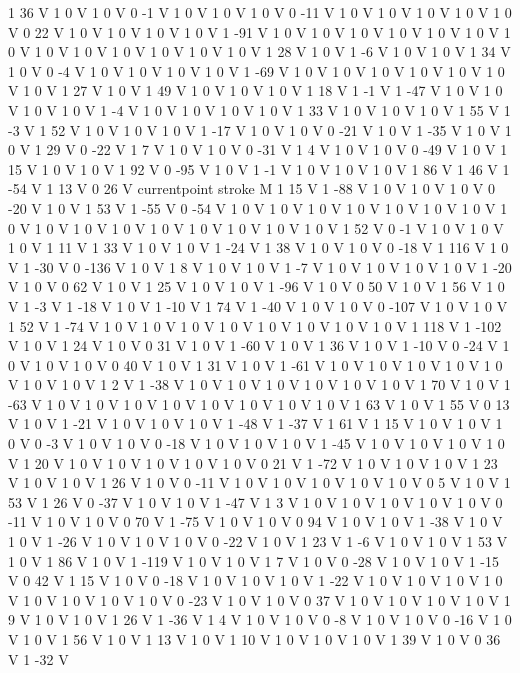 {{1 36 V
1 0 V
1 0 V
0 -1 V
1 0 V
1 0 V
1 0 V
0 -11 V
1 0 V
1 0 V
1 0 V
1 0 V
1 0 V
0 22 V
1 0 V
1 0 V
1 0 V
1 0 V
1 -91 V
1 0 V
1 0 V
1 0 V
1 0 V
1 0 V
1 0 V
1 0 V
1 0 V
1 0 V
1 0 V
1 0 V
1 0 V
1 0 V
1 28 V
1 0 V
1 -6 V
1 0 V
1 0 V
1 34 V
1 0 V
0 -4 V
1 0 V
1 0 V
1 0 V
1 0 V
1 -69 V
1 0 V
1 0 V
1 0 V
1 0 V
1 0 V
1 0 V
1 0 V
1 27 V
1 0 V
1 49 V
1 0 V
1 0 V
1 0 V
1 18 V
1 -1 V
1 -47 V
1 0 V
1 0 V
1 0 V
1 0 V
1 -4 V
1 0 V
1 0 V
1 0 V
1 0 V
1 33 V
1 0 V
1 0 V
1 0 V
1 55 V
1 -3 V
1 52 V
1 0 V
1 0 V
1 0 V
1 -17 V
1 0 V
1 0 V
0 -21 V
1 0 V
1 -35 V
1 0 V
1 0 V
1 29 V
0 -22 V
1 7 V
1 0 V
1 0 V
0 -31 V
1 4 V
1 0 V
1 0 V
0 -49 V
1 0 V
1 15 V
1 0 V
1 0 V
1 92 V
0 -95 V
1 0 V
1 -1 V
1 0 V
1 0 V
1 0 V
1 86 V
1 46 V
1 -54 V
1 13 V
0 26 V
currentpoint stroke M
1 15 V
1 -88 V
1 0 V
1 0 V
1 0 V
0 -20 V
1 0 V
1 53 V
1 -55 V
0 -54 V
1 0 V
1 0 V
1 0 V
1 0 V
1 0 V
1 0 V
1 0 V
1 0 V
1 0 V
1 0 V
1 0 V
1 0 V
1 0 V
1 0 V
1 0 V
1 0 V
1 52 V
0 -1 V
1 0 V
1 0 V
1 0 V
1 11 V
1 33 V
1 0 V
1 0 V
1 -24 V
1 38 V
1 0 V
1 0 V
0 -18 V
1 116 V
1 0 V
1 -30 V
0 -136 V
1 0 V
1 8 V
1 0 V
1 0 V
1 -7 V
1 0 V
1 0 V
1 0 V
1 0 V
1 -20 V
1 0 V
0 62 V
1 0 V
1 25 V
1 0 V
1 0 V
1 -96 V
1 0 V
0 50 V
1 0 V
1 56 V
1 0 V
1 -3 V
1 -18 V
1 0 V
1 -10 V
1 74 V
1 -40 V
1 0 V
1 0 V
0 -107 V
1 0 V
1 0 V
1 52 V
1 -74 V
1 0 V
1 0 V
1 0 V
1 0 V
1 0 V
1 0 V
1 0 V
1 0 V
1 118 V
1 -102 V
1 0 V
1 24 V
1 0 V
0 31 V
1 0 V
1 -60 V
1 0 V
1 36 V
1 0 V
1 -10 V
0 -24 V
1 0 V
1 0 V
1 0 V
0 40 V
1 0 V
1 31 V
1 0 V
1 -61 V
1 0 V
1 0 V
1 0 V
1 0 V
1 0 V
1 0 V
1 0 V
1 2 V
1 -38 V
1 0 V
1 0 V
1 0 V
1 0 V
1 0 V
1 0 V
1 70 V
1 0 V
1 -63 V
1 0 V
1 0 V
1 0 V
1 0 V
1 0 V
1 0 V
1 0 V
1 0 V
1 63 V
1 0 V
1 55 V
0 13 V
1 0 V
1 -21 V
1 0 V
1 0 V
1 0 V
1 -48 V
1 -37 V
1 61 V
1 15 V
1 0 V
1 0 V
1 0 V
0 -3 V
1 0 V
1 0 V
0 -18 V
1 0 V
1 0 V
1 0 V
1 -45 V
1 0 V
1 0 V
1 0 V
1 0 V
1 20 V
1 0 V
1 0 V
1 0 V
1 0 V
1 0 V
0 21 V
1 -72 V
1 0 V
1 0 V
1 0 V
1 23 V
1 0 V
1 0 V
1 26 V
1 0 V
0 -11 V
1 0 V
1 0 V
1 0 V
1 0 V
1 0 V
0 5 V
1 0 V
1 53 V
1 26 V
0 -37 V
1 0 V
1 0 V
1 -47 V
1 3 V
1 0 V
1 0 V
1 0 V
1 0 V
1 0 V
0 -11 V
1 0 V
1 0 V
0 70 V
1 -75 V
1 0 V
1 0 V
0 94 V
1 0 V
1 0 V
1 -38 V
1 0 V
1 0 V
1 -26 V
1 0 V
1 0 V
1 0 V
0 -22 V
1 0 V
1 23 V
1 -6 V
1 0 V
1 0 V
1 53 V
1 0 V
1 86 V
1 0 V
1 -119 V
1 0 V
1 0 V
1 7 V
1 0 V
0 -28 V
1 0 V
1 0 V
1 -15 V
0 42 V
1 15 V
1 0 V
0 -18 V
1 0 V
1 0 V
1 0 V
1 -22 V
1 0 V
1 0 V
1 0 V
1 0 V
1 0 V
1 0 V
1 0 V
1 0 V
0 -23 V
1 0 V
1 0 V
0 37 V
1 0 V
1 0 V
1 0 V
1 0 V
1 9 V
1 0 V
1 0 V
1 26 V
1 -36 V
1 4 V
1 0 V
1 0 V
0 -8 V
1 0 V
1 0 V
0 -16 V
1 0 V
1 0 V
1 56 V
1 0 V
1 13 V
1 0 V
1 10 V
1 0 V
1 0 V
1 0 V
1 39 V
1 0 V
0 36 V
1 -32 V
}}
